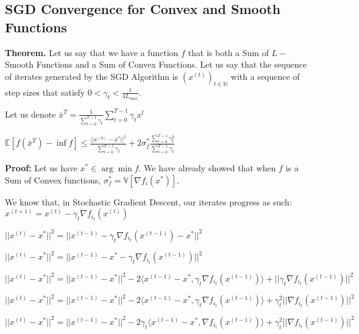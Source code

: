 \subsection{SGD Convergence for Convex and Smooth Functions}
\noindent \textbf{Theorem.} Let us say that we have a function $f$ that is both a Sum of $L-$Smooth Functions and a Sum of Convex Functions. Let us say that the sequence of iterates generated by the SGD Algorithm is $(x^{(t)})_{t \in \mathbb{N}}$ with a sequence of step sizes that satisfy $0 < \gamma_t < \frac{1}{4L_{max}}$. 

Let us denote $\bar{x}^T = \frac{1}{\sum_{t = 0}^{T - 1} \gamma_t} \sum_{t = 0}^{T - 1} \gamma_t x^t$ \newline 

$\mathbb{E}[f(\bar{x}^T) - \inf f] \leq \frac{||x^{(0)} - x^*||^2}{\sum_{t = 0}^{T - 1} \gamma_t} + 2\sigma_f^* \frac{\sum_{t = 0}^{T - 1} \gamma_t^2}{\sum_{t = 0}^{T - 1} \gamma_t}$

\noindent \textbf{Proof:} \newline 
Let us have $x^* \in \arg \min f$. We have already showed that when $f$ is a Sum of Convex functions, $\sigma_f^* = \mathbb{V}[\nabla f_i(x^*)]$. 

We know that, in Stochastic Gradient Descent, our iterates progress as such: $x^{(t + 1)}  = x^{(t)} - \gamma_t \nabla f_{i_t}(x^{(t)})$ \newline 

$||x^{(t)} - x^*||^2 = ||x^{(t - 1)} - \gamma_t \nabla f_{i_t}(x^{(t - 1)}) - x^*||^2$ \newline 

$||x^{(t)} - x^*||^2 = ||x^{(t - 1)} - x^* - \gamma_t \nabla f_{i_t}(x^{(t - 1)})||^2$ \newline 

$||x^{(t)} - x^*||^2 = ||x^{(t - 1)} - x^*||^2 - 2\langle x^{(t - 1)} - x^*,  \gamma_t \nabla f_{i_t}(x^{(t - 1)})\rangle + ||\gamma_t \nabla f_{i_t}(x^{(t - 1)})||^2$ \newline 

$||x^{(t)} - x^*||^2 = ||x^{(t - 1)} - x^*||^2 - 2\langle x^{(t - 1)} - x^*,  \gamma_t \nabla f_{i_t}(x^{(t - 1)})\rangle + \gamma_t^2 ||\nabla f_{i_t}(x^{(t - 1)})||^2$ \newline 

$||x^{(t)} - x^*||^2 = ||x^{(t - 1)} - x^*||^2 - 2\gamma_t \langle x^{(t - 1)} - x^*,  \nabla f_{i_t}(x^{(t - 1)})\rangle + \gamma_t^2 ||\nabla f_{i_t}(x^{(t - 1)})||^2$ \newline 

